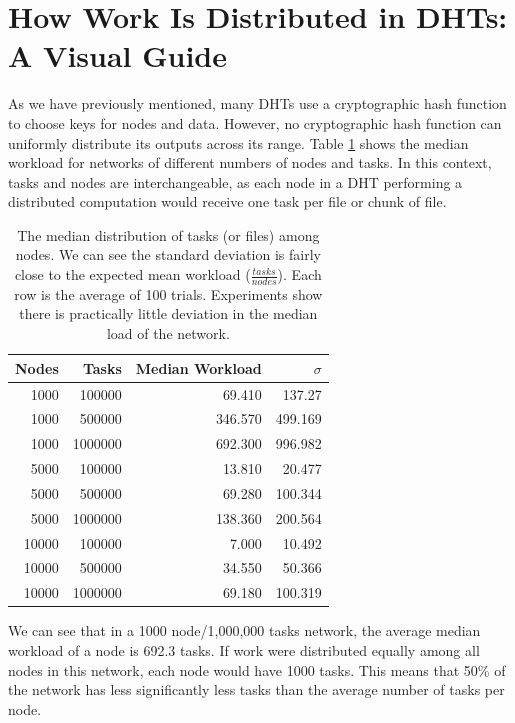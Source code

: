 \documentclass[11pt,conference]{IEEEtran}
\begin{document}
\section{How Work Is Distributed in DHTs: A Visual Guide}

As we have previously mentioned, many DHTs use a cryptographic hash function to choose keys for nodes and data.
However, no cryptographic hash function can uniformly distribute its outputs across its range. 
Table \ref{tab:medianLoads} shows the median workload for networks of different numbers of nodes and tasks.
In this context, tasks and nodes are interchangeable, as each node in a DHT performing a distributed computation would receive one task per file or chunk of file.


\begin{table}
	\centering
	\caption{The median distribution of tasks (or files) among nodes.  We can see the standard deviation is fairly close to the expected mean workload ($\frac{tasks}{nodes}$). Each row is the average of 100 trials.  Experiments show there is practically little deviation in the median load of the network.}
	\begin{tabular}{r r r r}
		Nodes & Tasks & Median Workload & $\sigma$ \\ \hline
		1000 & 100000 & 69.410   &  137.27  \\
		1000 & 500000 & 346.570  &  499.169 \\
		1000 & 1000000 & 692.300  &  996.982 \\
		
		5000 & 100000  & 13.810 & 20.477 \\ 
		5000 & 500000  & 69.280 & 100.344 \\ 
		5000 & 1000000 &138.360 & 200.564 \\ 
		
		10000 & 100000 & 7.000   &  10.492 \\
		10000 & 500000 & 34.550  &   50.366 \\
		10000 & 1000000& 69.180  &  100.319 \\
	\end{tabular}
	\label{tab:medianLoads}
\end{table}



We can see  that in a 1000 node/1,000,000 tasks network, the average median workload of a node is 692.3 tasks. 
If work were distributed equally among all nodes in this network, each node would have 1000 tasks.
This means that 50\% of the network has less significantly less tasks than the average number of tasks per node.
\end{document}
